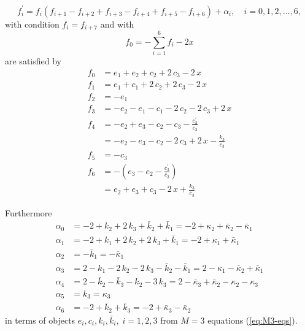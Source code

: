 \documentclass[12pt]{article}
\numberwithin{equation}{section}
\def\rf#1{(\ref{eq:#1})}
\def\lab#1{\label{eq:#1}}
\begin{document}
\begin{equation} 
f_i^{\prime} = f_i (f_{i+1}- f_{i+2} +f_{i+3}- f_{i+4}+f_{i+5} - f_{i+6} ) + \alpha_i, \quad
i=0,1,2, \ldots, 6, 
\lab{a16painleve}
\end{equation}
with condition $f_i=f_{i+7}$ and
with
\[
f_0= -\sum_{i=1}^6 f_i -2 x
\]
are satisfied by 
\begin{equation} \begin{split}
{f_0} &= {e_1} + {e_2} + {c_2} + 2\,
{c_3} - 2\,x \\
{f_1} &= {e_1} + {c_1} + 2\,{c_2} + 2\,
{c_3} - 2\,x\\
{f_2} &=  - {e_1}\\
{f_3} &=  - {e_2} - {e_1} - {c_1} - 2\,
{c_2} - 2\,{c_3} + 2\,x\\
{f_4} &= -e_2+e_3-c_2-c_3-\frac{c_3^{\prime}}{c_3}\\
&= - {e_2} - {e_3} - {c_2} - 2\,
{c_3} + 2\,x - {\displaystyle \frac {{k_3}}{{
c_3}}} \\
{f_5} &=  - {c_3}\\
{f_6} &= -\left( e_3-e_2-\frac{c_3^{\prime}}{c_3}\right)\\
&={e_2} + {e_3} + {c_3} - 2\,x + 
{\displaystyle \frac {{k_3}}{{c_3}}} 
\lab{fi-A16}
\end{split}
\end{equation}

Furthermore
\[ \begin{split}
{\alpha_0} &=  - 2 + {k_2} + 2\,{k_3} + {
{\bar k}_2} + {{\bar k}_1} =-2 +\kappa_2+{\bar \kappa}_2- {\bar
\kappa}_1\\
{\alpha_1} &=  - 2 + {k_1} + 2\,{k_2} + 2\,
{k_3} + {{\bar k}_1}=-2+\kappa_1+{\bar \kappa}_1\\
{\alpha_2} &=  - {{\bar k}_1}=-{\bar \kappa}_1\\
{\alpha_3} &= 2 - {k_1} - 2\,{k_2} - 2\,{k_3
} - {{\bar k}_2} - {{\bar k}_1}=2-\kappa_1- {\bar \kappa}_2+ 
{\bar\kappa}_1\\
{\alpha_4} &= 2 - {{\bar k}_2} - {{\bar k}_3} - {k_2} - 
3\,{k_3}= 2 -{\bar \kappa}_3 +{\bar \kappa}_2 -\kappa_2-\kappa_3\\
\alpha_5 &= k_3=\kappa_3\\
{\alpha_6} &=  - 2 + {{\bar k}_2} + {{\bar k}_3}=-2 
+{\bar \kappa}_3 -{\bar \kappa}_2
\end{split}
\]
in terms of objects  $e_i,c_i,k_i, {\bar k}_i, \; i=1,2,3$ from $M=3$ equations \rf{M3-eqs}.
\end{document}
